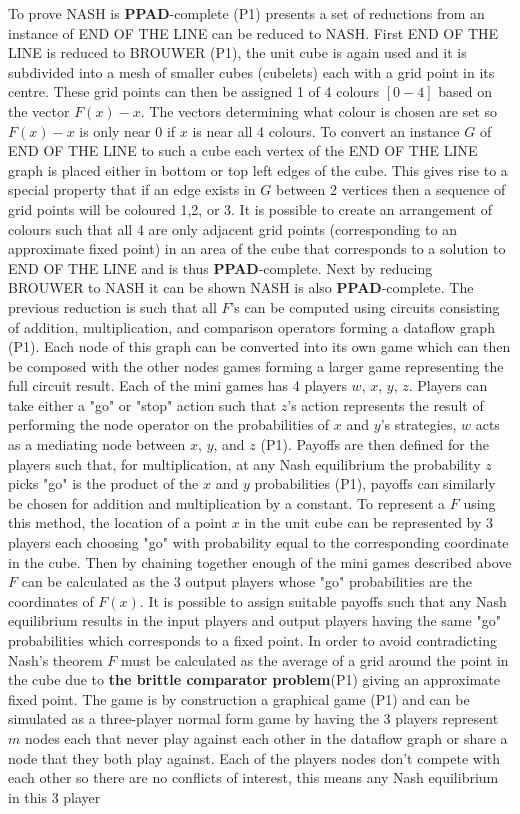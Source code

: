 \documentclass[]{article}
\begin{document}
To prove \textsc{NASH} is \textbf{PPAD}-complete (P1) presents a set of reductions from an instance of \textsc{END OF THE LINE} can be reduced to \textsc{NASH}. First \textsc{END OF THE LINE} is reduced to \textsc{BROUWER} (P1), the unit cube is again used and it is subdivided into a mesh of smaller cubes (cubelets)  each with a grid point in its centre. These grid points can then be assigned 1 of 4 colours $[0-4]$ based on the vector $F(x)-x$. The vectors determining what colour is chosen are set so $F(x)-x$ is only near $0$ if $x$ is near all 4 colours. To convert an instance $G$ of \textsc{END OF THE LINE} to such a cube each vertex of the \textsc{END OF THE LINE} graph is placed either in bottom or top left edges of the cube. This gives rise to a special property that if an edge exists in $G$ between 2 vertices then a sequence of grid points will be coloured 1,2, or 3. It is possible to create an arrangement of colours such that all 4 are only adjacent grid points (corresponding to an approximate fixed point) in an area of the cube that corresponds to a solution to \textsc{END OF THE LINE} and is thus \textbf{PPAD}-complete. Next by reducing \textsc{BROUWER} to \textsc{NASH} it can be shown \textsc{NASH} is also \textbf{PPAD}-complete. The previous reduction is such that all $F$'s can be computed using circuits consisting of addition, multiplication, and comparison operators forming a dataflow graph (P1). Each node of this graph can be converted into its own game which can then be composed with the other nodes games forming a larger game representing the full circuit result. Each of the mini games has 4 players $w$, $x$, $y$, $z$. Players can take either a "go" or "stop" action such that $z$'s action represents the result of performing the node operator on the probabilities of $x$ and $y$'s strategies, $w$ acts as a mediating node between $x$, $y$, and $z$ (P1). Payoffs are then defined for the players such that, for multiplication, at any Nash equilibrium the probability $z$ picks "go" is the product of the $x$ and $y$ probabilities (P1), payoffs can similarly be chosen for addition and multiplication by a constant. To represent a $F$ using this method, the location of a point $x$ in the unit cube can be represented by 3 players each choosing "go" with probability equal to the corresponding coordinate in the cube. Then by chaining together enough of the mini games described above $F$ can be calculated as the 3 output players whose "go" probabilities are the coordinates of $F(x)$. It is possible to assign suitable payoffs such that any Nash equilibrium results in the input players and output players having the same "go" probabilities which corresponds to a fixed point. In order to avoid contradicting Nash's theorem $F$ must be calculated as the average of a grid around the point in the cube due to \textbf{the brittle comparator problem}(P1) giving an approximate fixed point. The game is by construction a graphical game (P1) and can be simulated as a three-player normal form game by having the 3 players represent $m$ nodes each that never play against each other in the dataflow graph or share a node that they both play against. Each of the players nodes don't compete with each other so there are no conflicts of interest, this means any Nash equilibrium in this 3 player 
\end{document}
